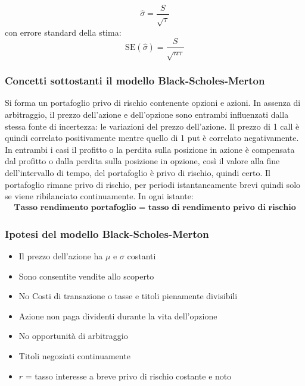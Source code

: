 \documentclass[12pt,a4paper]{report}
\begin{document}
\[
\hat{\sigma} = \frac{S}{\sqrt{\tau}}
\]
con errore standard della stima:
\[
\mathrm{SE}(\hat{\sigma}) = \frac{S}{\sqrt{n \tau}}
\]
\newpage
\subsubsection{Concetti sottostanti il modello Black-Scholes-Merton}
Si forma un portafoglio privo di rischio contenente opzioni e azioni. In assenza di arbitraggio, il prezzo dell'azione e dell'opzione sono entrambi influenzati dalla stessa fonte di incertezza: le variazioni del prezzo dell'azione.
Il prezzo di 1 call è quindi correlato positivamente mentre quello di 1 put è correlato negativamente.
In entrambi i casi il profitto o la perdita sulla posizione in azione è compensata dal profitto o dalla perdita sulla posizione in opzione, così il valore alla fine dell'intervallo di tempo, del portafoglio è privo di rischio, quindi certo.
Il portafoglio rimane privo di rischio, per periodi istantaneamente brevi quindi solo se viene ribilanciato continuamente.
\newline
In ogni istante: 
\begin{align}
    \textbf{Tasso rendimento portafoglio = tasso di rendimento privo di rischio}
\end{align}
\subsubsection{Ipotesi del modello Black-Scholes-Merton}
\begin{itemize}
    \item Il prezzo dell'azione ha \(\mu\) e \(\sigma\) costanti
    \item Sono consentite vendite allo scoperto
    \item No Costi di transazione o tasse e titoli pienamente divisibili
    \item Azione non paga dividenti durante la vita dell'opzione
    \item No opportunità di arbitraggio
    \item Titoli negoziati continuamente
    \item \(r\) = tasso interesse a breve privo di rischio costante e noto
\end{itemize}
\newpage
\end{document}
